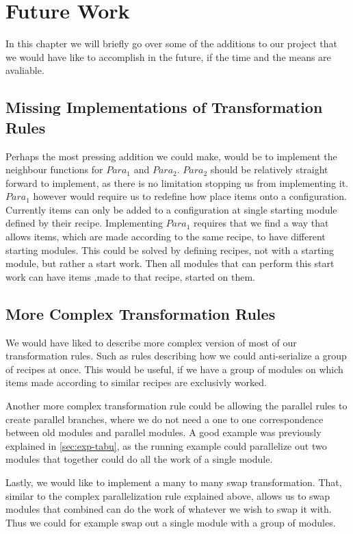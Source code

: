 \chapter{Future Work}
In this chapter we will briefly go over some of the additions to our project that we would have like to accomplish in the future, if the time and the means are avaliable.

\section{Missing Implementations of Transformation Rules}
Perhaps the most pressing addition we could make, would be to implement the neighbour functions for $Para_1$ and $Para_2$. $Para_2$ should be relatively straight forward to implement, as there is no limitation stopping us from implementing it. $Para_1$ however would require us to redefine how place items onto a configuration. Currently items can only be added to a configuration at single starting module defined by their recipe. Implementing $Para_1$ requires that we find a way that allows items, which are made according to the same recipe, to have different starting modules. This could be solved by defining recipes, not with a starting module, but rather a start work. Then all modules that can perform this start work can have items ,made to that recipe, started on them.

\section{More Complex Transformation Rules}
We would have liked to describe more complex version of most of our transformation rules. Such as rules describing how we could anti-serialize a group of recipes at once. This would be useful, if we have a group of modules on which items made according to similar recipes are exclusivly worked.

Another more complex transformation rule could be allowing the parallel rules to create parallel branches, where we do not need a one to one correspondence between old modules and parallel modules. A good example was previously explained in \cref{sec:exp-tabu}, as the running example could parallelize out two modules that together could do all the work of a single module.

Lastly, we would like to implement a many to many swap transformation. That, similar to the complex parallelization rule explained above, allows us to swap modules that combined can do the work of whatever we wish to swap it with. Thus we could for example swap out a single module with a group of modules. 

